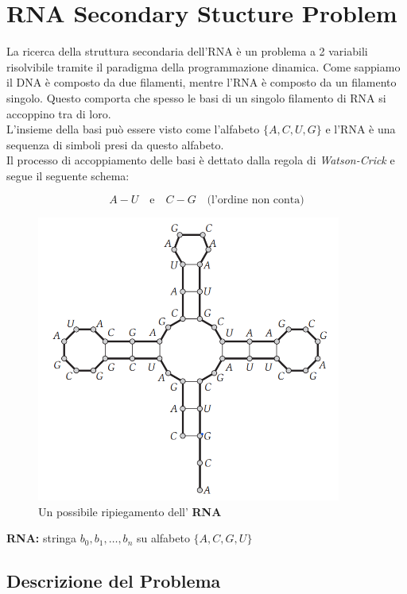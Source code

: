 \chapter{RNA Secondary Stucture Problem}
\label{chap:rna}

La ricerca della struttura secondaria dell'RNA è un problema a 2
variabili risolvibile tramite il paradigma della programmazione
dinamica. Come sappiamo il DNA è composto da due filamenti, mentre l'RNA
è composto da un filamento singolo. Questo comporta che spesso le basi
di un singolo filamento di RNA si accoppino tra di loro.\\

L'insieme della basi può essere visto come l'alfabeto $\{A, C, U, G\}$
e l'RNA è una sequenza di simboli presi da questo alfabeto.\\

Il processo di accoppiamento delle basi è dettato dalla regola di
\emph{Watson-Crick} e segue il seguente schema:

\[
  A - U \ \ \ \text{ e } \ \ \ C - G \ \ \ \text{ (l'ordine non conta)}
\]


\begin{figure}[H]
  \centering
  \includegraphics[width=10cm, keepaspectratio]{capitoli/programmazione_dinamica/imgs/rna1.png}
  \caption{Un possibile ripiegamento dell' \textbf{RNA}}
\end{figure}


\textbf{RNA:} stringa $b_0,b_1, \ldots, b_n$ su alfabeto $\{A, C, G, U\}$

\section{Descrizione del Problema}

